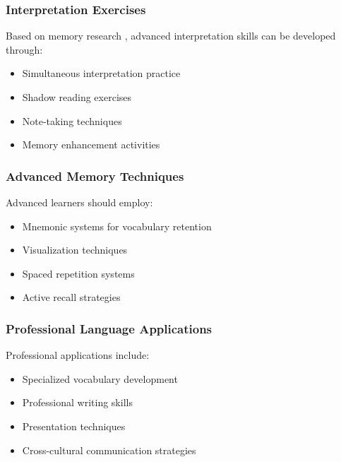 \subsubsection{Interpretation Exercises}
Based on memory research \citep{memory2022techniques}, advanced interpretation skills can be developed through:
\begin{itemize}
    \item Simultaneous interpretation practice
    \item Shadow reading exercises
    \item Note-taking techniques
    \item Memory enhancement activities
\end{itemize}

\subsubsection{Advanced Memory Techniques}
Advanced learners should employ:
\begin{itemize}
    \item Mnemonic systems for vocabulary retention
    \item Visualization techniques
    \item Spaced repetition systems
    \item Active recall strategies
\end{itemize}

\subsubsection{Professional Language Applications}
Professional applications include:
\begin{itemize}
    \item Specialized vocabulary development
    \item Professional writing skills
    \item Presentation techniques
    \item Cross-cultural communication strategies
\end{itemize} 
